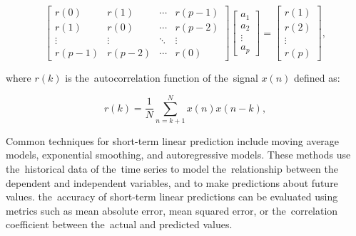 \begin{equation}
  \begin{bmatrix}
    r(0) & r(1) & \cdots & r(p-1) \\
    r(1) & r(0) & \cdots & r(p-2) \\
    \vdots & \vdots & \ddots & \vdots \\
    r(p-1) & r(p-2) & \cdots & r(0)
  \end{bmatrix}
  \begin{bmatrix}
    a_1 \\
    a_2 \\
    \vdots \\
    a_p
  \end{bmatrix}
  =
  \begin{bmatrix}
    r(1) \\
    r(2) \\
    \vdots \\
    r(p)
  \end{bmatrix},
  \label{eq:matrix-equation}
\end{equation}

where $r(k)$ is the~autocorrelation function of the~signal $x(n)$ defined as:

\begin{equation}
  r(k) = \frac{1}{N} \sum_{n=k+1}^{N} x(n) x(n-k),
  \label{eq:autocorrelation}
\end{equation}

Common techniques for short-term linear prediction include moving average models, exponential smoothing, and
autoregressive models. These methods use the~historical data of the~time series to model the~relationship between the
dependent and independent variables, and to make predictions about future values. the~accuracy of short-term linear
predictions can be evaluated using metrics such as mean absolute error, mean squared error, or the~correlation
coefficient between the~actual and predicted values.

